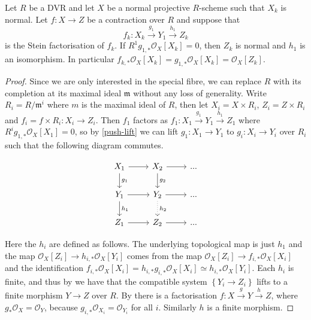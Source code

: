 \documentclass[a4paper,12pt]{book}
\newcommand{\cO}{\mathcal{O}}
\newcommand{\ox}{\mathcal{O}_{X}}
\begin{document}
	\begin{theorem}\label{adj-push}
		Let $R$ be a DVR and let $X$ be a normal projective $R$-scheme such that $X_{k}$ is normal. 
		Let $f \colon X \to Z$ be a contraction over $R$ and suppose that $$f_{k}\colon X_{k} \xrightarrow{g_{1}} Y_{1} \xrightarrow{h_{1}} Z_{k}$$ is the Stein factorisation of $f_{k}$. If $R^{1}g_{1,*} \ox[X_{k}]=0$, then $Z_k$ is normal and $h_{1}$ is an isomorphism. In particular $f_{k,*}\ox[X_{k}]=g_{1,*}\ox[X_{k}]=\ox[Z_{k}].$
	\end{theorem}
	
	\begin{proof}
		Since we are only interested in the special fibre, we can replace $R$ with its completion at its maximal ideal $\mathfrak{m}$ without any loss of generality.
		Write $R_{i}=R/\mathfrak{m}^{i}$ where $m$ is the maximal ideal of $R$, then let $X_{i}=X \times R_{i}$, $Z_{i}=Z\times R_{i}$ and $f_{i}=f\times R_{i}\colon X_{i} \to Z_{i}$.
		Then $f_{1}$ factors as $f_{1}\colon X_{1} \xrightarrow{g_{1}} Y_{1} \xrightarrow{h_{1}} Z_{1}$ where $R^{i}g_{1,*}\ox[X_{1}]=0$, so by \autoref{push-lift} we can lift $g_{1}\colon X_{1} \to Y_{1}$ to $g_{i}\colon X_{i} \to Y_{i}$ over $R_{i}$ such that the following diagram commutes.
		
		\[\begin{tikzcd}
			X_{1} \arrow[r] \arrow[d, "g_{1}"] & X_{2} \arrow[r] \arrow[d, "g_{2}"] & ... \\
			Y_{1} \arrow[r] \arrow[d, "h_{1}"] & Y_{2} \arrow[d, dotted, "h_{2}"] \arrow[r]  & ... \\
			Z_{1} \arrow[r]                    & Z_{2} \arrow[r]                    & ...
		\end{tikzcd}\]
		
		Here the $h_{i}$ are defined as follows. The underlying topological map is just $h_{1}$ and the map $\ox[Z_{i}] \to h_{i,*}\ox[Y_{i}]$ comes from the map ${\ox[Z_{i}] \to f_{i,*}\ox[X_{i}]}$ and the identification $f_{i,*}\ox[X_{i}]=h_{i,*}g_{i,*}\ox[X_{i}]\simeq h_{i,*}\ox[Y_{i}]$.
		Each $h_{i}$ is finite, and thus by
		\cite[\href{https://stacks.math.columbia.edu/tag/09ZT}{Tag 09ZT}]{stacks-project} we have that the compatible system $\left\{Y_{i} \to Z_i \right\}$ lifts to a finite morphism $Y \to Z$ over $R$. By \cite[\href{https://stacks.math.columbia.edu/tag/0A42}{Tag 0A42}]{stacks-project} there is a factorisation ${f\colon X \xrightarrow{g} Y \xrightarrow{h} Z}$, where $g_{*}\ox = \cO_Y$, because $g_{i,*}\cO_{X_i}=\cO_{Y_i}$ for all $i$. Similarly $h$ is a finite morphism. 
		

\end{proof}
\end{document}
